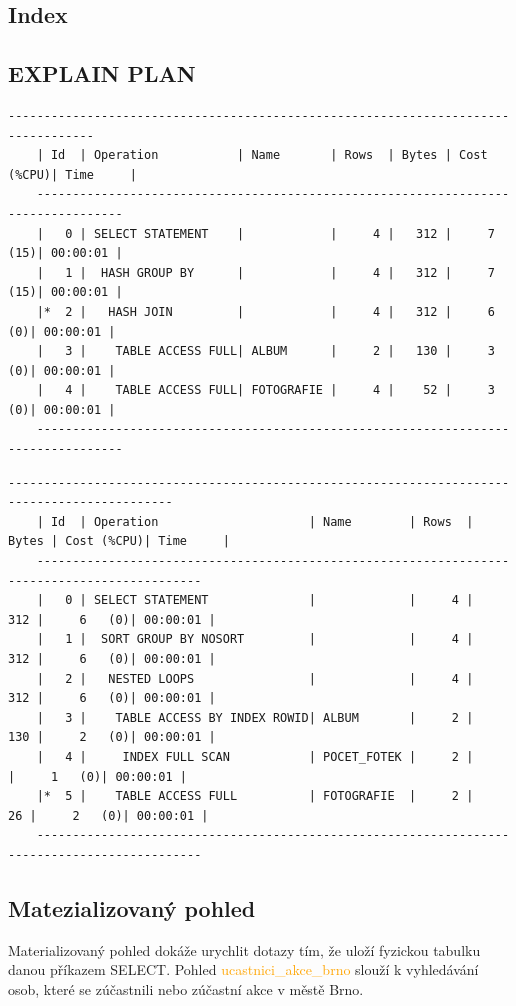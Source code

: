 \documentclass[11pt,a4paper]{article}
\begin{document}
    \subsection{Index}
    
    
    \subsection{EXPLAIN PLAN}
   \begin{Verbatim}[fontsize=\small]
    ----------------------------------------------------------------------------------
    | Id  | Operation           | Name       | Rows  | Bytes | Cost (%CPU)| Time     |
    ----------------------------------------------------------------------------------
    |   0 | SELECT STATEMENT    |            |     4 |   312 |     7  (15)| 00:00:01 |
    |   1 |  HASH GROUP BY      |            |     4 |   312 |     7  (15)| 00:00:01 |
    |*  2 |   HASH JOIN         |            |     4 |   312 |     6   (0)| 00:00:01 |
    |   3 |    TABLE ACCESS FULL| ALBUM      |     2 |   130 |     3   (0)| 00:00:01 |
    |   4 |    TABLE ACCESS FULL| FOTOGRAFIE |     4 |    52 |     3   (0)| 00:00:01 |
    ----------------------------------------------------------------------------------
    \end{Verbatim}
    
    \begin{Verbatim}[fontsize=\small]
    ---------------------------------------------------------------------------------------------
    | Id  | Operation                     | Name        | Rows  | Bytes | Cost (%CPU)| Time     |
    ---------------------------------------------------------------------------------------------
    |   0 | SELECT STATEMENT              |             |     4 |   312 |     6   (0)| 00:00:01 |
    |   1 |  SORT GROUP BY NOSORT         |             |     4 |   312 |     6   (0)| 00:00:01 |
    |   2 |   NESTED LOOPS                |             |     4 |   312 |     6   (0)| 00:00:01 |
    |   3 |    TABLE ACCESS BY INDEX ROWID| ALBUM       |     2 |   130 |     2   (0)| 00:00:01 |
    |   4 |     INDEX FULL SCAN           | POCET_FOTEK |     2 |       |     1   (0)| 00:00:01 |
    |*  5 |    TABLE ACCESS FULL          | FOTOGRAFIE  |     2 |    26 |     2   (0)| 00:00:01 |
    ---------------------------------------------------------------------------------------------
    \end{Verbatim}
    
    \subsection{Matezializovaný pohled}
    Materializovaný pohled dokáže urychlit dotazy tím, že uloží fyzickou tabulku danou příkazem SELECT.
    Pohled \textcolor{orange}{ucastnici\_akce\_brno} slouží k vyhledávání osob, které se zúčastnili nebo zúčastní akce v městě Brno.
\end{document}
